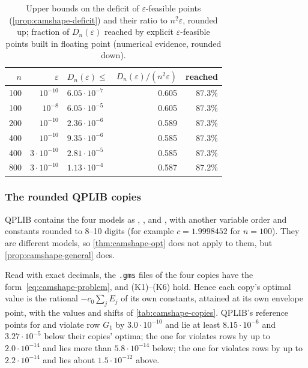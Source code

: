 \begin{table}[ht]
\centering
\small
\caption{Upper bounds on the deficit of $\varepsilon$-feasible points (\cref{prop:camshape-deficit}) and their ratio to $n^2\varepsilon$, rounded up; fraction of $D_n(\varepsilon)$ reached by explicit $\varepsilon$-feasible points built in floating point (numerical evidence, rounded down).}
\label{tab:camshape-deficit}
\begin{tabular}{@{}rrlrr@{}}
\toprule
$n$ & $\varepsilon$ & $D_n(\varepsilon) \le$ & $D_n(\varepsilon)/(n^2\varepsilon)$ & reached \\
\midrule
100 & $10^{-10}$ & $6.05\cdot10^{-7}$ & 0.605 & 87.3\% \\
100 & $10^{-8}$ & $6.05\cdot10^{-5}$ & 0.605 & 87.3\% \\
200 & $10^{-10}$ & $2.36\cdot10^{-6}$ & 0.589 & 87.3\% \\
400 & $10^{-10}$ & $9.35\cdot10^{-6}$ & 0.585 & 87.3\% \\
400 & $3\cdot10^{-10}$ & $2.81\cdot10^{-5}$ & 0.585 & 87.3\% \\
800 & $3\cdot10^{-10}$ & $1.13\cdot10^{-4}$ & 0.587 & 87.2\% \\
\bottomrule
\end{tabular}
\end{table}

\subsubsection{The rounded QPLIB copies}\label{app:camshape-copies}

QPLIB contains the four models as , ,  and  \citep{furini2018-qplib-a-library-of-quadratic,cache2026-qplib-pages-and-rounded-camshape}, with another variable order and constants rounded to 8--10 digits (for example $c = 1.9998452$ for $n = 100$).
They are different models, so \cref{thm:camshape-opt} does not apply to them, but \cref{prop:camshape-general} does.

\begin{proposition}\label{prop:camshape-copies}
Read with exact decimals, the \texttt{.gms} files of the four copies have the form~\eqref{eq:camshape-problem}, and (K1)--(K6) hold.
Hence each copy's optimal value is the rational $-c_0\sum_j E_j$ of its own constants, attained at its own envelope point, with the values and shifts of \cref{tab:camshape-copies}.
QPLIB's reference points \citep{furini2026-qplib-official-solution-point-records} for  and  violate row $G_1$ by $3.0\cdot10^{-10}$ and lie at least $8.15\cdot10^{-6}$ and $3.27\cdot10^{-5}$ below their copies' optima; the one for  violates rows by up to $2.0\cdot10^{-14}$ and lies more than $5.8\cdot10^{-14}$ below; the one for  violates rows by up to $2.2\cdot10^{-14}$ and lies about $1.5\cdot10^{-12}$ above.
\end{proposition}

